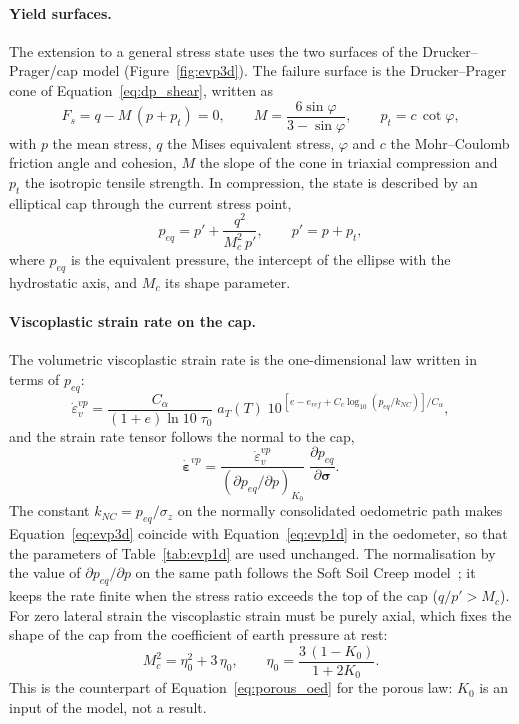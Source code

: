 \paragraph{Yield surfaces.} The extension to a general stress state uses the two surfaces of the Drucker--Prager/cap model (Figure~\ref{fig:evp3d}). The failure surface is the Drucker--Prager cone of Equation~\eqref{eq:dp_shear}, written as
\begin{equation}
    F_s = q - M\,(p + p_t) = 0, \qquad M = \frac{6\sin\varphi}{3-\sin\varphi}, \qquad p_t = c\,\cot\varphi,
    \label{eq:dp_shear}
\end{equation}
with $p$ the mean stress, $q$ the Mises equivalent stress, $\varphi$ and $c$ the Mohr--Coulomb friction angle and cohesion, $M$ the slope of the cone in triaxial compression and $p_t$ the isotropic tensile strength. In compression, the state is described by an elliptical cap through the current stress point,
\begin{equation}
    p_{eq} = p' + \frac{q^2}{M_c^2\,p'}, \qquad p' = p + p_t,
    \label{eq:peq}
\end{equation}
where $p_{eq}$ is the equivalent pressure, the intercept of the ellipse with the hydrostatic axis, and $M_c$ its shape parameter.

\paragraph{Viscoplastic strain rate on the cap.} The volumetric viscoplastic strain rate is the one-dimensional law written in terms of $p_{eq}$:
\begin{equation}
    \dot\varepsilon_v^{vp} = \frac{C_\alpha}{(1+e)\ln10\;\tau_0}\;a_T(T)\;10^{\,[e - e_{ref} + C_c\log_{10}(p_{eq}/k_{NC})]/C_\alpha},
    \label{eq:evp3d}
\end{equation}
and the strain rate tensor follows the normal to the cap,
\begin{equation}
    \dot{\boldsymbol\varepsilon}^{vp} = \frac{\dot\varepsilon_v^{vp}}{(\partial p_{eq}/\partial p)_{K_0}}\;\frac{\partial p_{eq}}{\partial\boldsymbol\sigma}.
    \label{eq:evp3d_flow}
\end{equation}
The constant $k_{NC} = p_{eq}/\sigma_z$ on the normally consolidated oedometric path makes Equation~\eqref{eq:evp3d} coincide with Equation~\eqref{eq:evp1d} in the oedometer, so that the parameters of Table~\ref{tab:evp1d} are used unchanged. The normalisation by the value of $\partial p_{eq}/\partial p$ on the same path follows the Soft Soil Creep model~\cite{vermeer1999}; it keeps the rate finite when the stress ratio exceeds the top of the cap ($q/p' > M_c$). For zero lateral strain the viscoplastic strain must be purely axial, which fixes the shape of the cap from the coefficient of earth pressure at rest:
\begin{equation}
    M_c^2 = \eta_0^2 + 3\,\eta_0, \qquad \eta_0 = \frac{3\,(1-K_0)}{1+2K_0}.
    \label{eq:Mc_K0}
\end{equation}
This is the counterpart of Equation~\eqref{eq:porous_oed} for the porous law: $K_0$ is an input of the model, not a result.

